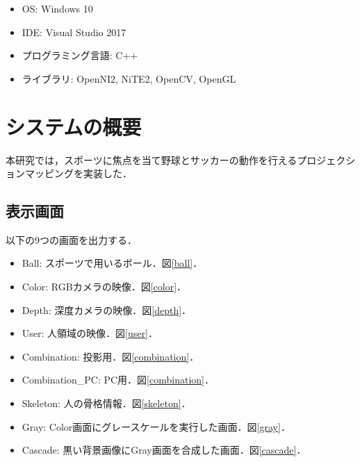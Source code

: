 \begin{itemize}
    \item OS: Windows 10
    \item IDE: Visual Studio 2017
    \item プログラミング言語: C++
    \item ライブラリ: OpenNI2, NiTE2, OpenCV, OpenGL
\end{itemize}

\section{システムの概要}
本研究では，スポーツに焦点を当て野球とサッカーの動作を行えるプロジェクションマッピングを実装した．


\subsection{表示画面}
以下の9つの画面を出力する．

\begin{itemize}
    \item Ball: スポーツで用いるボール．図\ref{ball}．
    \item Color: RGBカメラの映像．図\ref{color}．
    \item Depth: 深度カメラの映像．図\ref{depth}．
    \item User: 人領域の映像．図\ref{user}．
    \item Combination: 投影用．図\ref{combination}．
    \item Combination\_PC: PC用．図\ref{combination}．
    \item Skeleton: 人の骨格情報．図\ref{skeleton}．
    \item Gray: Color画面にグレースケールを実行した画面．図\ref{gray}．
    \item Cascade: 黒い背景画像にGray画面を合成した画面．図\ref{cascade}．
\end{itemize}

\clearpage

